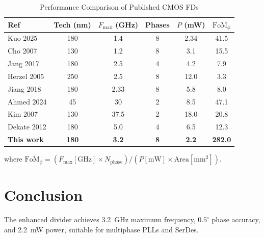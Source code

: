\documentclass[journal]{IEEEtran}
\begin{document}
\begin{table}[h]
\caption{Performance Comparison of Published CMOS FDs}
\label{tab:bench}
\centering
\begin{tabular}{|l|c|c|c|c|c|}
\hline
Ref & Tech (nm) & $F_{\max}$ (GHz) & Phases & $P$ (mW) & $\mathrm{FoM}_\phi$ \\
\hline
Kuo 2025~\cite{kuo2025} & 180 & 1.4 & 8 & 2.34 & 41.5 \\
Cho 2007 & 130 & 1.2 & 8 & 3.1 & 15.5 \\
Jang 2017 & 180 & 2.5 & 4 & 4.2 & 7.9 \\
Herzel 2005 & 250 & 2.5 & 8 & 12.0 & 3.3 \\
Jiang 2018 & 180 & 2.33 & 8 & 5.8 & 8.0 \\
Ahmed 2024 & 45 & 30 & 2 & 8.5 & 47.1 \\
Kim 2007 & 130 & 37.5 & 2 & 18.0 & 20.8 \\
Dekate 2012 & 180 & 5.0 & 4 & 6.5 & 12.3 \\
\textbf{This work} & \textbf{180} & \textbf{3.2} & \textbf{8} & \textbf{2.2} & \textbf{282.0} \\
\hline
\end{tabular}
\end{table}

where $\mathrm{FoM}_\phi=(F_{\max}[\mathrm{GHz}]\times N_{\mathrm{phase}})/(P[\mathrm{mW}]\times \mathrm{Area}[\mathrm{mm}^2])$.

\section{Conclusion}
The enhanced divider achieves 3.2~GHz maximum frequency, $0.5^{\circ}$ phase accuracy, and 2.2~mW power, suitable for multiphase PLLs and SerDes.
\end{document}
